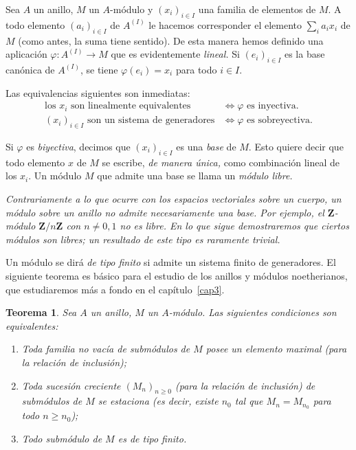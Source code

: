 \documentclass[bibtotoc,leqno,spanish]{amsbook}
\newcommand{\ZZ}{\mathbf{Z}}
\renewcommand{\to}[1][]{\xrightarrow{#1}}
\numberwithin{equation}{section}
\newenvironment{comm}%
	{\begin{list}{}{\setlength{\leftmargin}{2\parindent}\setlength{\topsep}{\baselineskip}}\item\itshape}
	{\end{list}}
\theoremstyle{note}
\theoremstyle{note}
\newtheorem{theorem}{Teorema}
\theoremstyle{rem}
\numberwithin{theorem}{section}
\numberwithin{proposition}{section}
\numberwithin{definition}{section}
\numberwithin{lemma}{section}
\numberwithin{corollary}{section}
\numberwithin{example}{section}
\numberwithin{footnote}{section}%
\begin{document}
Sea $A$ un anillo, $M$ un $A$-m\'odulo y $(x_{i})_{i\in I}$ una familia de elementos
de $M$. A todo elemento
$(a_{i})_{i\in I}$ de $A^{(I)}$ le hacemos corresponder el elemento $\sum_{i}a_{i}x_{i}$
de $M$ (como antes, la
suma tiene sentido). De esta manera hemos definido una aplicaci\'on
$\varphi:A^{(I)}\to M$ que es evidentemente
{\em lineal.} Si $(e_{i})_{i\in I}$ es la base can\'onica de $A^{(I)}$, se
tiene $\varphi(e_{i}) = x_{i}$ para todo
$i\in I$.

Las equivalencias siguientes son inmediatas:
\begin{align}
\text{los $x_{i}$ son linealmente equivalentes} &\iff \text{$\varphi$ es inyectiva.}\\
\text{$(x_{i})_{i\in I}$ son un sistema de generadores} &\iff \text{$\varphi$ es sobreyectiva.}
\end{align}

Si $\varphi$ es {\em biyectiva}, decimos que $(x_{i})_{i\in I}$ es una {\em base}
de $M$. Esto quiere decir que
todo elemento $x$ de $M$ se escribe, {\em de manera \'unica,} como combinaci\'on lineal
de los $x_{i}$. Un m\'odulo
$M$ que admite una base se llama un {\em m\'odulo libre.}

\begin{comm}
Contrariamente a lo que ocurre con los espacios vectoriales sobre un cuerpo, un
m\'odulo sobre un
anillo no admite necesariamente una base. Por ejemplo, el $\ZZ$-m\'odulo $\ZZ/n\ZZ$
con $n\neq 0,1$
no es libre.
En lo que sigue demostraremos que ciertos m\'odulos son libres; un resultado de este
tipo es raramente trivial.
\end{comm}

Un m\'odulo se dir\'a {\em de tipo finito} si admite un sistema finito de
generadores. El siguiente teorema
es b\'asico para el estudio de los anillos y m\'odulos noetherianos, que estudiaremos
m\'as a fondo en el cap\'itulo~\ref{cap3}.

\begin{theorem}\label{teo1.4.1}
Sea $A$ un anillo, $M$ un $A$-m\'odulo. Las siguientes condiciones son equivalentes:
\begin{enumerate}
\item Toda familia no vac\'ia de subm\'odulos de $M$ posee un elemento maximal
(para la relaci\'on de inclusi\'on);
\item Toda sucesi\'on creciente $(M_{n})_{n\geq 0}$ (para la relaci\'on de inclusi\'on)
de subm\'odulos
de $M$ se estaciona (es decir, existe $n_{0}$ tal que $M_{n} = M_{n_{0}}$ para
todo $n\geq n_{0}$);
\item Todo subm\'odulo de $M$ es de tipo finito.
\end{enumerate}
\end{theorem}
\end{document}
